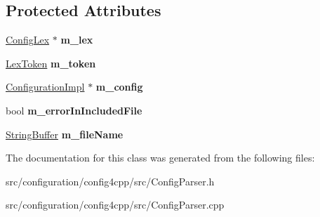 \subsection*{Protected Attributes}
\begin{DoxyCompactItemize}
\item 
\hypertarget{classCONFIG4CPP__NAMESPACE_1_1ConfigParser_a0454d15db35437983805aa47010a0a0d}{\hyperlink{classCONFIG4CPP__NAMESPACE_1_1ConfigLex}{Config\-Lex} $\ast$ {\bfseries m\-\_\-lex}}\label{classCONFIG4CPP__NAMESPACE_1_1ConfigParser_a0454d15db35437983805aa47010a0a0d}

\item 
\hypertarget{classCONFIG4CPP__NAMESPACE_1_1ConfigParser_a16ae5acb4160f597143d399ceb1c22cf}{\hyperlink{classCONFIG4CPP__NAMESPACE_1_1LexToken}{Lex\-Token} {\bfseries m\-\_\-token}}\label{classCONFIG4CPP__NAMESPACE_1_1ConfigParser_a16ae5acb4160f597143d399ceb1c22cf}

\item 
\hypertarget{classCONFIG4CPP__NAMESPACE_1_1ConfigParser_a716038bffef5fa6a143f673115bedefb}{\hyperlink{classCONFIG4CPP__NAMESPACE_1_1ConfigurationImpl}{Configuration\-Impl} $\ast$ {\bfseries m\-\_\-config}}\label{classCONFIG4CPP__NAMESPACE_1_1ConfigParser_a716038bffef5fa6a143f673115bedefb}

\item 
\hypertarget{classCONFIG4CPP__NAMESPACE_1_1ConfigParser_a19b1290ffae923b11d2a5352d8629433}{bool {\bfseries m\-\_\-error\-In\-Included\-File}}\label{classCONFIG4CPP__NAMESPACE_1_1ConfigParser_a19b1290ffae923b11d2a5352d8629433}

\item 
\hypertarget{classCONFIG4CPP__NAMESPACE_1_1ConfigParser_a788d825da67fb95584cb85c47f7b6a31}{\hyperlink{classCONFIG4CPP__NAMESPACE_1_1StringBuffer}{String\-Buffer} {\bfseries m\-\_\-file\-Name}}\label{classCONFIG4CPP__NAMESPACE_1_1ConfigParser_a788d825da67fb95584cb85c47f7b6a31}

\end{DoxyCompactItemize}


The documentation for this class was generated from the following files\-:\begin{DoxyCompactItemize}
\item 
src/configuration/config4cpp/src/Config\-Parser.\-h\item 
src/configuration/config4cpp/src/Config\-Parser.\-cpp\end{DoxyCompactItemize}
